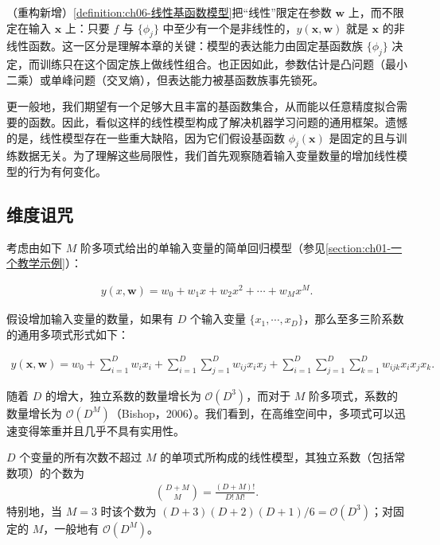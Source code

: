 \documentclass[../../main.tex]{subfiles}
\begin{document}
\begin{remark}（重构新增）\cref{definition:ch06-线性基函数模型}把“线性”限定在参数 $\boldsymbol{w}$ 上，而不限定在输入 $\boldsymbol{x}$ 上：只要 $f$ 与 $\{\phi_j\}$ 中至少有一个是非线性的，$y(\boldsymbol{x},\boldsymbol{w})$ 就是 $\boldsymbol{x}$ 的非线性函数。这一区分是理解本章的关键：模型的表达能力由固定基函数族 $\{\phi_j\}$ 决定，而训练只在这个固定族上做线性组合。也正因如此，参数估计是凸问题（最小二乘）或单峰问题（交叉熵），但表达能力被基函数族事先锁死。
\end{remark}

更一般地，我们期望有一个足够大且丰富的基函数集合，从而能以任意精度拟合需要的函数。因此，看似这样的线性模型构成了解决机器学习问题的通用框架。遗憾的是，线性模型存在一些重大缺陷，因为它们假设基函数 $\phi_j(\boldsymbol{x})$ 是固定的且与训练数据无关。为了理解这些局限性，我们首先观察随着输入变量数量的增加线性模型的行为有何变化。

\subsection{维度诅咒}\label{subsection:ch06-维度诅咒}

考虑由如下 $M$ 阶多项式给出的单输入变量的简单回归模型（参见\cref{section:ch01-一个教学示例}）：

\begin{align}
y(x,\boldsymbol{w})=w_0+w_1x+w_2x^{2}+\cdots+w_Mx^{M}.
\label{align:ch06-多项式一维}
\end{align}

假设增加输入变量的数量，如果有 $D$ 个输入变量 $\{x_1,\cdots,x_D\}$，那么至多三阶系数的通用多项式形式如下：

\begin{align}
y(\boldsymbol{x},\boldsymbol{w})=w_0+\sum_{i=1}^{D}w_ix_i+\sum_{i=1}^{D}\sum_{j=1}^{D}w_{ij}x_ix_j+\sum_{i=1}^{D}\sum_{j=1}^{D}\sum_{k=1}^{D}w_{ijk}x_ix_jx_k.
\label{align:ch06-多项式多维}
\end{align}

随着 $D$ 的增大，独立系数的数量增长为 $\mathcal{O}(D^{3})$，而对于 $M$ 阶多项式，系数的数量增长为 $\mathcal{O}(D^{M})$（Bishop，2006）。我们看到，在高维空间中，多项式可以迅速变得笨重并且几乎不具有实用性。

\begin{proposition}[多项式系数的数量]\label{proposition:ch06-多项式系数增长}
$D$ 个变量的所有次数不超过 $M$ 的单项式所构成的线性模型，其独立系数（包括常数项）的个数为
\begin{align}
\binom{D+M}{M}=\frac{(D+M)!}{D!\,M!}.
\label{align:ch06-多项式系数个数}
\end{align}
特别地，当 $M=3$ 时该个数为 $(D+3)(D+2)(D+1)/6=\mathcal{O}(D^{3})$；对固定的 $M$，一般地有 $\mathcal{O}(D^{M})$。
\end{proposition}
\end{document}

